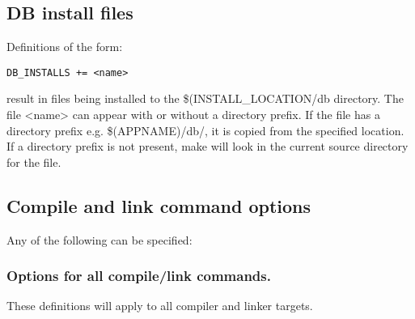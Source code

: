 \subsection{DB install files}

Definitions of the form:

\begin{verbatim}DB_INSTALLS += <name>
\end{verbatim}result in files being installed to the \$(INSTALL\_LOCATION/db directory. The file \textless{}name\textgreater{} can appear with or without a 
directory prefix. If the file has a directory prefix e.g. \$(APPNAME)/db/, it is copied from the specified location. If a 
directory prefix is not present, make will look in the current source directory for the file.

\subsection{Compile and link command options}

Any of the following can be specified:

\subsubsection{Options for all compile/link commands.}

These definitions will apply to all compiler and linker targets.

